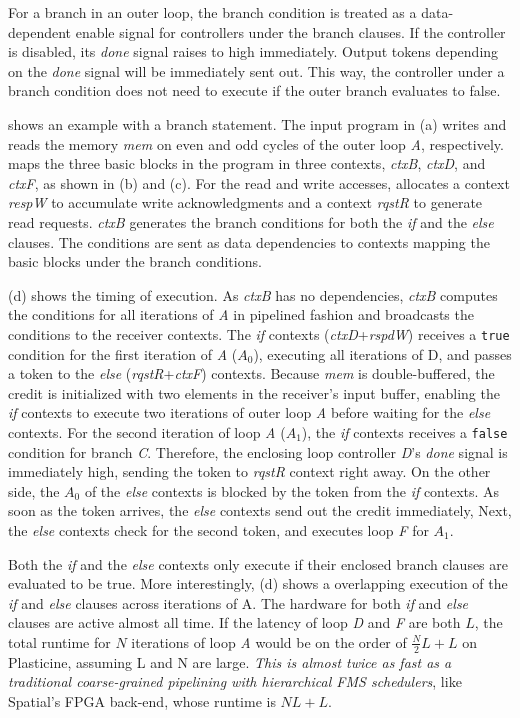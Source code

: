 For a branch in an outer loop,
the branch condition is treated as a data-dependent enable signal for controllers under the branch clauses.
If the controller is disabled, its \emph{done} signal raises to high immediately.
Output tokens depending on the {\em done} signal will be immediately sent out.
This way, the controller under a branch condition does not need to execute if the outer branch
evaluates to false.

 shows an example with a branch statement.
The input program in (a) writes and reads the memory \emph{mem} on even and odd cycles of
the outer loop \emph{A}, respectively. 
\name maps the three basic blocks in the program in three
contexts, \emph{ctxB}, \emph{ctxD}, and \emph{ctxF}, as shown in (b) and (c). 
For the read and write accesses, \name
allocates a context \emph{respW} to accumulate write acknowledgments and a context \emph{rqstR} 
to generate read requests. 
\emph{ctxB} generates the branch conditions for both the \emph{if} and the \emph{else} clauses.
The conditions are sent as data dependencies to contexts mapping the basic blocks under the branch conditions.

 (d) shows the timing of execution.
As \emph{ctxB} has no dependencies, \emph{ctxB} computes the conditions for all iterations of
\emph{A} in
pipelined fashion and broadcasts the conditions to the receiver contexts.
The \emph{if} contexts (\emph{ctxD}+\emph{rspdW}) receives a \texttt{true} condition for the first
iteration of \emph{A} ($A_0$), 
executing all iterations of D, and passes a token to the \emph{else} (\emph{rqstR}+\emph{ctxF}) contexts.
Because \emph{mem} is double-buffered, the credit is initialized with two elements in the
receiver's input buffer, enabling the \emph{if} contexts to execute two iterations of outer loop
\emph{A} before
waiting for the \emph{else} contexts. For the second iteration of loop \emph{A} ($A_1$), the \emph{if} contexts
receives a \texttt{false} condition for branch \emph{C}.
Therefore, the enclosing loop controller \emph{D}'s \emph{done} signal is immediately high, sending the
token to \emph{rqstR} context right away.
On the other side, the $A_0$ of the \emph{else} contexts is blocked by the token from
the \emph{if} contexts. 
As soon as the token arrives, the \emph{else} contexts send out the credit immediately,
Next, the \emph{else} contexts check for the second token, 
and executes loop \emph{F} for $A_1$.

Both the \emph{if} and the \emph{else} contexts only execute if their enclosed branch clauses are
evaluated to be true. More interestingly,  (d) shows a overlapping execution of the
\emph{if} and \emph{else} clauses across iterations of A. 
The hardware for both \emph{if} and \emph{else} clauses are active almost all time.
If the latency of loop \emph{D} and \emph{F} are both $L$, 
the total runtime for $N$ iterations of loop \emph{A} would be on the order of $\frac{N}{2}L+L$
on Plasticine, assuming L and N are large.
\emph{This is almost twice as fast as a traditional coarse-grained pipelining with hierarchical FMS
schedulers}, like Spatial's FPGA back-end, whose runtime is $NL+L$.

